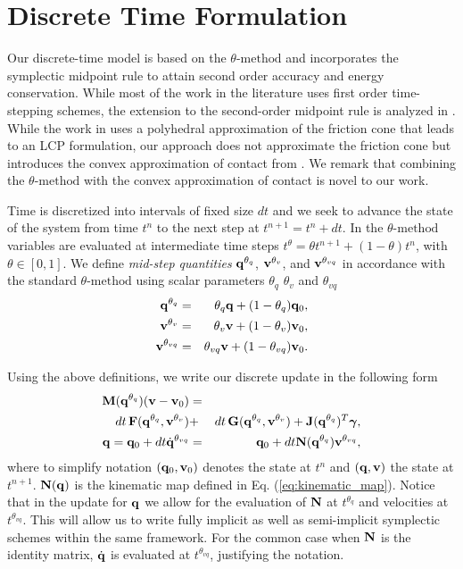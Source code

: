 \section{Discrete Time Formulation}
\label{sec:discrete_time_formulation}

Our discrete-time model is based on the $\theta\text{-method}$ \cite[\S
II.7]{bib:hairer2008solving} and incorporates the symplectic midpoint rule to
attain second order accuracy and energy conservation. While most of the work in
the literature uses first order time-stepping schemes, the extension to the
second-order midpoint rule is analyzed in \cite{bib:potra2006linearly}. While
the work in \cite{bib:potra2006linearly} uses a polyhedral approximation of the
friction cone that leads to an LCP formulation, our approach does not
approximate the friction cone but introduces the convex approximation of contact
from \cite{bib:anitescu2006} . We remark that combining the $\theta\text{-method}$ with the
convex approximation of contact is novel to our work. 

Time is discretized into intervals of fixed size $dt$ and we seek to advance the
state of the system from time $t^n$ to the next step at $t^{n+1} = t^n + dt$. In
the $\theta\text{-method}$ variables are evaluated at intermediate time steps
$t^\theta = \theta t^{n+1}+(1-\theta)t^{n}$, with $\theta \in [0, 1]$. We define
\emph{mid-step quantities} ${\mathbf{q}}^{\theta_{q}}$, ${\mathbf{v}}^{\theta_{v}}$, and
${\mathbf{v}}^{\theta_{vq}}$ in accordance with the standard $\theta\text{-method}$
using scalar parameters $\theta_q$ $\theta_v$ and $\theta_{vq}$
\begin{eqnarray*}
	{\mathbf{q}}^{\theta_q} &=& \theta_q{\mathbf{q}} + (1-\theta_{q}){\mathbf{q}}_0,\\
	{\mathbf{v}}^{\theta_v} &=& \theta_v{\mathbf{v}} + (1-\theta_v){\mathbf{v}}_0,\\
	{\mathbf{v}}^{\theta_{vq}} &=& \theta_{vq}{\mathbf{v}} + (1-\theta_{vq}){\mathbf{v}}_0.
\end{eqnarray*}

Using the above definitions, we write our discrete update in the following form
\begin{eqnarray}
	\mf{M}(\mf{q}^{\theta_{q}})(\mf{v}-\mf{v}_0)  &=& \nonumber\\
	dt\,\mf{F}(\mf{q}^{\theta_{q}}, \mf{v}^{\theta_v}) &+&
	dt\,\mf{G}(\mf{q}^{\theta_{q}}, \mf{v}^{\theta_v}) +
	\mf{J}(\mf{q}^{\theta_{q}})^T\mf{\bgamma}, \label{eq:v_update}\\
	\mf{q} = \mf{q}_0 + dt \dot{\mf{q}}^{\theta_{vq}} &=& \mf{q}_0 + dt\mf{N}(\mf{q}^{\theta_{q}})\mf{v}^{\theta_{vq}},
	\label{eq:q_update}
\end{eqnarray}
where to simplify notation $({\mathbf{q}}_0, {\mathbf{v}}_0)$ denotes the state at $t^n$ and
$({\mathbf{q}}, {\mathbf{v}})$ the state at $t^{n+1}$. ${\mathbf{N}}({\mathbf{q}})$ is the kinematic map
defined in Eq. (\ref{eq:kinematic_map}). Notice that in the update for ${\mathbf{q}}$
we allow for the evaluation of ${\mathbf{N}}$ at $t^{\theta_{q}}$ and velocities
at $t^{\theta_{vq}}$. This will allow us to write fully implicit as well as
semi-implicit symplectic schemes within the same framework. For the common case
when ${\mathbf{N}}$ is the identity matrix, $\dot{{\mathbf{q}}}$ is evaluated at
$t^{\theta_{vq}}$, justifying the notation.

